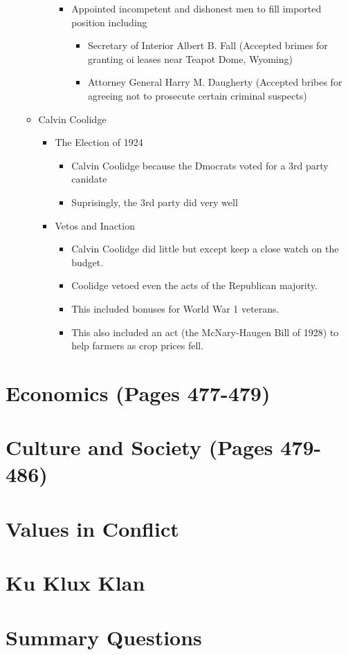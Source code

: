 \documentclass[12pt]{article} %
\begin{document}
\begin{enumerate}
\begin{itemize}
\begin{itemize}
\begin{itemize}
				\item Appointed incompetent and dishonest men to fill imported position including
				\begin{itemize}
					\item Secretary of Interior Albert B. Fall (Accepted brimes for granting oi leases near Teapot Dome, Wyoming)
					\item Attorney General Harry M. Daugherty (Accepted bribes for agreeing not to prosecute certain criminal suspects)
				\end{itemize}
			\end{itemize}
		\end{itemize}
		\item Calvin Coolidge
		\begin{itemize}
			\item The Election of 1924
			\begin{itemize}
				\item Calvin Coolidge because the Dmocrats voted for a 3rd party canidate
				\item Suprisingly, the 3rd party did very well
			\end{itemize}
			\item Vetos and Inaction
			\begin{itemize}
				\item Calvin Coolidge did little but except keep a close watch on the budget.
				\item Coolidge vetoed even the acts of the Republican majority.
				\item This included bonuses for World War 1 veterans.
				\item This also included an act (the McNary-Haugen Bill of 1928) to help farmers as crop prices fell.
			\end{itemize}
		\end{itemize}
	\end{itemize}
\end{enumerate}

\section{Economics (Pages 477-479)}

\section{Culture and Society (Pages 479-486)}

\section{Values in Conflict}

\section{Ku Klux Klan}

\section{Summary Questions}
\end{document}

